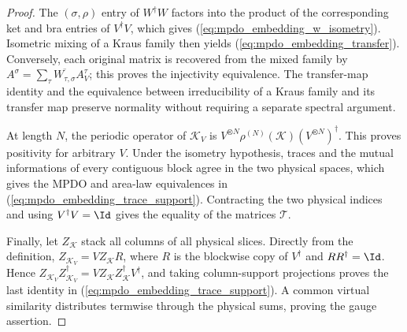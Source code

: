 \begin{proof}
    \leanok
    The $(\sigma,\rho)$ entry of $W^\dagger W$ factors into the product of
    the corresponding ket and bra entries of $V^\dagger V$, which gives
    (\ref{eq:mpdo_embedding_w_isometry}).  Isometric mixing of
    a Kraus family then yields (\ref{eq:mpdo_embedding_transfer}).  Conversely, each
    original matrix is recovered from the mixed family by
    $A^\sigma=\sum_\tau\overline{W_{\tau,\sigma}}A_V^\tau$; this proves the
    injectivity equivalence.  The transfer-map identity and the equivalence
    between irreducibility of a Kraus family and its transfer map preserve
    normality without requiring a separate spectral argument.

    At length $N$, the periodic operator of $\mathcal K_V$ is
    $V^{\otimes N}\rho^{(N)}(\mathcal K)(V^{\otimes N})^\dagger$.
    This proves positivity for arbitrary $V$.  Under the isometry hypothesis,
    traces and the mutual informations of every contiguous block agree in the
    two physical spaces, which gives the MPDO and area-law equivalences in
    (\ref{eq:mpdo_embedding_trace_support}).  Contracting the two physical
    indices and using $V^\dagger V=\Id$ gives the equality of the matrices
    $\mathcal T$.

    Finally, let $Z_{\mathcal K}$ stack all columns of all physical slices.
    Directly from the definition,
    $Z_{\mathcal K_V}=VZ_{\mathcal K}R$, where $R$ is the blockwise copy of
    $V^\dagger$ and $RR^\dagger=\Id$.  Hence
    $Z_{\mathcal K_V}Z_{\mathcal K_V}^\dagger
        =VZ_{\mathcal K}Z_{\mathcal K}^\dagger V^\dagger$,
    and taking column-support projections proves the last identity in
    (\ref{eq:mpdo_embedding_trace_support}).  A common virtual similarity
    distributes termwise through the physical sums, proving the gauge
    assertion.
\end{proof}
